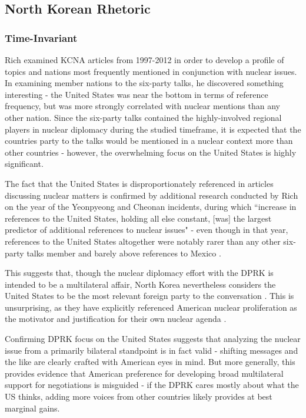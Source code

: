 \documentclass{article}
\begin{document}
\subsection{North Korean Rhetoric}
\subsubsection{Time-Invariant}
Rich \cite{rich14} examined KCNA articles from 1997-2012 in order to develop a profile of topics and nations most frequently mentioned in conjunction with nuclear issues. In examining member nations to the six-party talks, he discovered something interesting -  the United States was near the bottom in terms of reference frequency, but was more strongly correlated with nuclear mentions than any other nation. Since the six-party talks contained the highly-involved regional players in nuclear diplomacy during the studied timeframe, it is expected that the countries party to the talks would be mentioned in a nuclear context more than other countries - however, the overwhelming focus on the United States is highly significant.

The fact that the United States is disproportionately referenced in articles discussing nuclear matters is confirmed by additional research conducted by Rich on the year of the Yeonpyeong and Cheonan incidents, during which ``increase in references to the United States, holding all else constant, [was] the largest predictor of additional references to nuclear issues" - even though in that year, references to the United States altogether were notably rarer than any other six-party talks member and barely above references to Mexico \cite{rich12}.

This suggests that, though the nuclear diplomacy effort with the DPRK is intended to be a multilateral affair, North Korea nevertheless considers the United States to be the most relevant foreign party to the conversation \cite{rich14}. This is unsurprising, as they have explicitly referenced American nuclear proliferation as the motivator and justification for their own nuclear agenda \cite{kcna, kcna3, kcna4}.

Confirming DPRK focus on the United States suggests that analyzing the nuclear issue from a primarily bilateral standpoint is in fact valid - shifting messages and the like are clearly crafted with American eyes in mind. But more generally, this provides evidence that American preference for developing broad multilateral support for negotiations is misguided - if the DPRK cares mostly about what the US thinks, adding more voices from other countries likely provides at best marginal gains.
\end{document}
